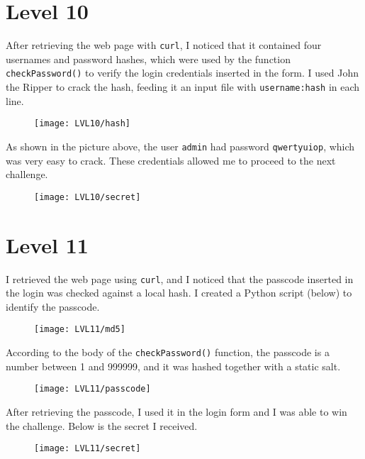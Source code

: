 \documentclass[12pt,a4paper]{article}
\begin{document}
	\section*{Level 10}
After retrieving the web page with \texttt{curl}, I noticed that it contained four usernames and password hashes, which were used by the function \texttt{checkPassword()} to verify the login credentials inserted in the form. I used John the Ripper to crack the hash, feeding it an input file with \texttt{username:hash} in each line.\begin{figure}[H]
		\centering
		\texttt{[image: LVL10/hash]}
		\label{fig:john}
	\end{figure}As shown in the picture above, the user \texttt{admin} had password \texttt{qwertyuiop}, which was very easy to crack. These credentials allowed me to proceed to the next challenge.
	\begin{figure}[H]
		\centering
		\texttt{[image: LVL10/secret]}
		\label{fig:secret10}
	\end{figure} 	

	\section*{Level 11}

	I retrieved the web page using \texttt{curl}, and I noticed that the passcode inserted in the login was checked against a local hash. I created a Python script (below) to identify the passcode.
	\begin{figure}[H]
		\centering
		\texttt{[image: LVL11/md5]}
		\label{fig:md5}
	\end{figure}
According to the body of the \texttt{checkPassword()} function, the passcode is a number between 1 and 999999, and it was hashed together with a static salt.
	\begin{figure}[H]
		\centering
		\texttt{[image: LVL11/passcode]}
		\label{fig:foundhash}
	\end{figure}
After retrieving the passcode, I used it in the login form and I was able to win the challenge. Below is the secret I received.
	\begin{figure}[H]
		\centering
		\texttt{[image: LVL11/secret]}
		\label{fig:secret11}
	\end{figure}
\end{document}
